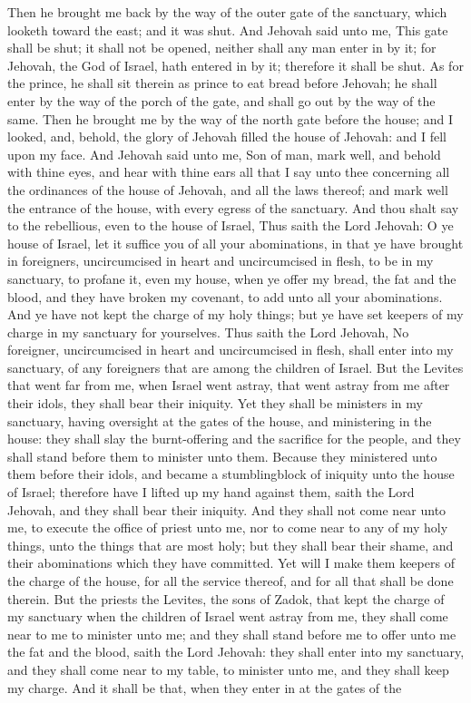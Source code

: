 Then he brought me back by the way of the outer gate of the sanctuary, which looketh toward the east; and it was shut. And Jehovah said unto me, This gate shall be shut; it shall not be opened, neither shall any man enter in by it; for Jehovah, the God of Israel, hath entered in by it; therefore it shall be shut. As for the prince, he shall sit therein as prince to eat bread before Jehovah; he shall enter by the way of the porch of the gate, and shall go out by the way of the same.  Then he brought me by the way of the north gate before the house; and I looked, and, behold, the glory of Jehovah filled the house of Jehovah: and I fell upon my face. And Jehovah said unto me, Son of man, mark well, and behold with thine eyes, and hear with thine ears all that I say unto thee concerning all the ordinances of the house of Jehovah, and all the laws thereof; and mark well the entrance of the house, with every egress of the sanctuary. And thou shalt say to the rebellious, even to the house of Israel, Thus saith the Lord Jehovah: O ye house of Israel, let it suffice you of all your abominations, in that ye have brought in foreigners, uncircumcised in heart and uncircumcised in flesh, to be in my sanctuary, to profane it, even my house, when ye offer my bread, the fat and the blood, and they have broken my covenant, to add unto all your abominations. And ye have not kept the charge of my holy things; but ye have set keepers of my charge in my sanctuary for yourselves.  Thus saith the Lord Jehovah, No foreigner, uncircumcised in heart and uncircumcised in flesh, shall enter into my sanctuary, of any foreigners that are among the children of Israel. But the Levites that went far from me, when Israel went astray, that went astray from me after their idols, they shall bear their iniquity. Yet they shall be ministers in my sanctuary, having oversight at the gates of the house, and ministering in the house: they shall slay the burnt-offering and the sacrifice for the people, and they shall stand before them to minister unto them. Because they ministered unto them before their idols, and became a stumblingblock of iniquity unto the house of Israel; therefore have I lifted up my hand against them, saith the Lord Jehovah, and they shall bear their iniquity. And they shall not come near unto me, to execute the office of priest unto me, nor to come near to any of my holy things, unto the things that are most holy; but they shall bear their shame, and their abominations which they have committed. Yet will I make them keepers of the charge of the house, for all the service thereof, and for all that shall be done therein.  But the priests the Levites, the sons of Zadok, that kept the charge of my sanctuary when the children of Israel went astray from me, they shall come near to me to minister unto me; and they shall stand before me to offer unto me the fat and the blood, saith the Lord Jehovah: they shall enter into my sanctuary, and they shall come near to my table, to minister unto me, and they shall keep my charge. And it shall be that, when they enter in at the gates of the 